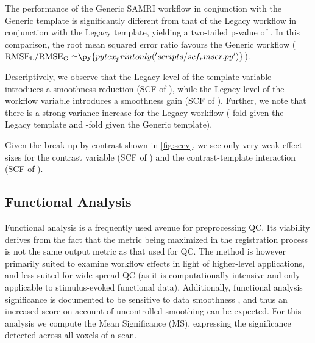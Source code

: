 The performance of the Generic SAMRI workflow in conjunction with the Generic template is significantly different from that of the Legacy workflow in conjunction with the Legacy template, yielding a two-tailed p-value of .
In this comparison, the root mean squared error ratio favours the Generic workflow
($\mathrm{RMSE_{L}/RMSE_{G}\simeq} \py{pytex_printonly('scripts/scf_rmser.py')}$).

Descriptively, we observe that the Legacy level of the template variable introduces a smoothness reduction
(SCF of ),
while the Legacy level of the workflow variable introduces a smoothness gain
(SCF of ).
Further, we note that there is a strong variance increase for the Legacy workflow
(-fold given the Legacy template and -fold given the Generic template).

Given the break-up by contrast shown in \cref{fig:sccv}, we see only very weak effect sizes for the contrast variable
(SCF of )
and the contrast-template interaction
(SCF of ).

\subsection{Functional Analysis}

Functional analysis is a frequently used avenue for preprocessing QC.
Its viability derives from the fact that the metric being maximized in the registration process is not the same output metric as that used for QC.
The method is however primarily suited to examine workflow effects in light of higher-level applications, and less suited for wide-spread QC (as it is computationally intensive and only applicable to stimulus-evoked functional data).
Additionally, functional analysis significance is documented to be sensitive to data smoothness \cite{Molloy2014}, and thus an increased score on account of uncontrolled smoothing can be expected.
For this analysis we compute the Mean Significance (MS), expressing the significance detected across all voxels of a scan.

